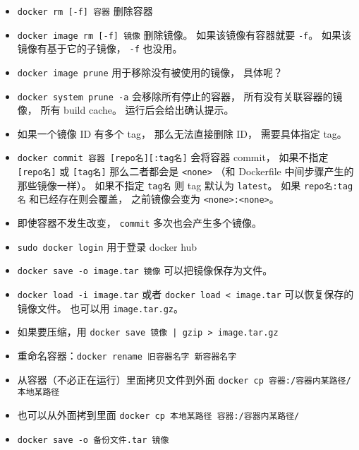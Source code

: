 \begin{itemize}
\item \verb`docker rm [-f] 容器` 删除容器
\item \verb`docker image rm [-f] 镜像` 删除镜像。 如果该镜像有容器就要 \verb`-f`。 如果该镜像有基于它的子镜像， \verb`-f` 也没用。
\item \verb`docker image prune` 用于移除没有被使用的镜像， 具体呢？
\item \verb`docker system prune -a` 会移除所有停止的容器， 所有没有关联容器的镜像， 所有 build cache。 运行后会给出确认提示。
\item 如果一个镜像 ID 有多个 tag， 那么无法直接删除 ID， 需要具体指定 tag。
\item \verb`docker commit 容器 [repo名][:tag名]` 会将容器 commit， 如果不指定 \verb`[repo名]` 或 \verb`[tag名]` 那么二者都会是 \verb`<none>` （和 Dockerfile 中间步骤产生的那些镜像一样）。 如果不指定 \verb`tag名` 则 tag 默认为 \verb`latest`。 如果 \verb`repo名:tag名` 和已经存在则会覆盖， 之前镜像会变为 \verb`<none>:<none>`。
\item 即使容器不发生改变， \verb`commit` 多次也会产生多个镜像。
\item \verb`sudo docker login` 用于登录 docker hub
\item \verb`docker save -o image.tar 镜像` 可以把镜像保存为文件。
\item \verb`docker load -i image.tar` 或者 \verb`docker load < image.tar` 可以恢复保存的镜像文件。 也可以用 \verb`image.tar.gz`。
\item 如果要压缩，用 \verb`docker save 镜像 | gzip > image.tar.gz`
\item 重命名容器：\verb`docker rename 旧容器名字 新容器名字`
\item 从容器（不必正在运行）里面拷贝文件到外面 \verb`docker cp 容器:/容器内某路径/ 本地某路径`
\item 也可以从外面拷到里面 \verb`docker cp 本地某路径 容器:/容器内某路径/`
\item \verb`docker save -o 备份文件.tar 镜像`
\end{itemize}

